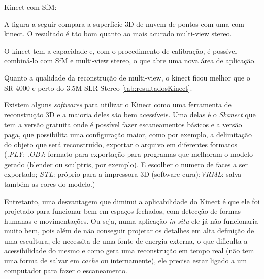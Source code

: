 Kinect com SfM:

A figura a seguir compara a superfície 3D de nuvem de pontos com uma com kinect. O resultado é tão bom quanto ao mais acurado multi-view stereo.

O kinect tem a capacidade e, com o procedimento de calibração, é possível combiná-lo com SfM e multi-view stereo, o que abre uma nova área de aplicação.

Quanto a qualidade da reconstrução de multi-view, o kinect ficou melhor que o SR-4000 e perto do 3.5M SLR Stereo \ref{tab:resultadosKinect}.

Existem alguns {\it softwares} para utilizar o Kinect como uma ferramenta de reconstrução 3D e a maioria deles são bem acessíveis. Uma delas é o {\it Skanect} que tem a versão gratuita onde é possível fazer escaneamentos básicos e a versão paga, que possibilita uma configuração maior, como por exemplo, a delimitação do objeto que será reconstruído, exportar o arquivo em diferentes formatos ({\it .PLY}; {.\it OBJ}: formato para exportação para programas que melhoram o modelo gerado (blender ou sculptris, por exemplo). E escolher o numero de faces a ser exportado; {\it STL}: próprio para a impressora 3D (software cura);{\it VRML}: salva também as cores do modelo.)

Entretanto, uma desvantagem que diminui a aplicabilidade do Kinect é que ele foi projetado para funcionar bem em espaços fechados, com detecção de formas humanas e movimentações. Ou seja, numa aplicação {\it in situ} ele já não funcionaria muito bem, pois além de não conseguir projetar os detalhes em alta definição de uma escultura, ele necessita de uma fonte de energia externa, o que dificulta a acessibilidade do mesmo e como gera uma reconstrução em tempo real (não tem uma forma de salvar em {\it cache} ou internamente), ele precisa estar ligado a um computador para fazer o escaneamento.